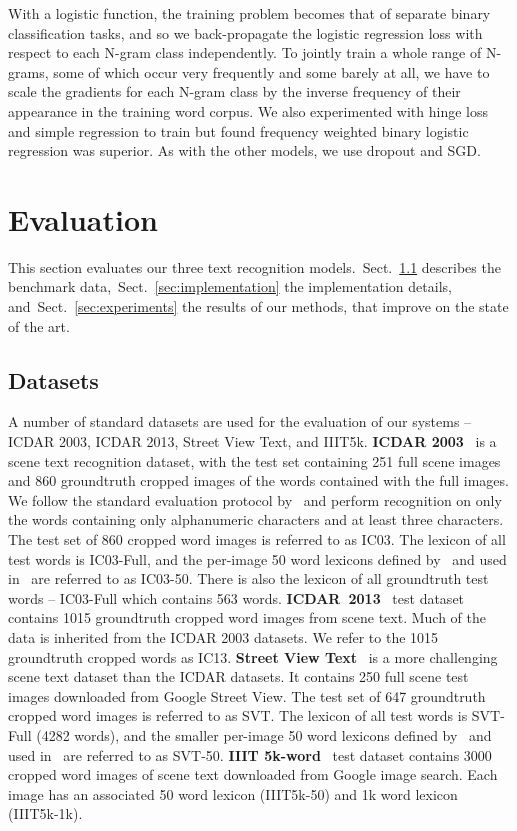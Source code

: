 \documentclass{article} \usepackage{nips14submit_e,times}
\newcommand{\sref}[1]{Sect.~\ref{#1}}
\renewcommand{\paragraph}[1]{\par\noindent{\bf #1}}
\begin{document}
\paragraph{Training.}
With a logistic function, the training problem becomes that of  separate binary classification tasks, and so we back-propagate the logistic regression loss with respect to each N-gram class independently. To jointly train a whole range of N-grams, some of which occur very frequently and some barely at all, we have to scale the gradients for each N-gram class by the inverse frequency of their appearance in the training word corpus. We also experimented with hinge loss and simple regression to train but found frequency weighted binary logistic regression was superior. As with the other models, we use dropout and SGD.


\section{Evaluation}\label{sec:eval}
This section evaluates our three text recognition models.~\sref{sec:data} describes the benchmark data,~\sref{sec:implementation} the implementation details, and~\sref{sec:experiments} the results of our methods, that improve on the state of the art.


\subsection{Datasets}\label{sec:data}
A number of standard datasets are used for the evaluation of our systems -- ICDAR 2003, ICDAR 2013, Street View Text, and IIIT5k. {\bf ICDAR 2003}~\cite{ICDAR03} is a scene text recognition dataset, with the test set containing 251 full scene images and 860 groundtruth cropped images of the words contained with the full images. We follow the standard evaluation protocol by~\cite{Wang11,Wang12,Alsharif13} and perform recognition on only the words containing only alphanumeric characters and at least three characters. The test set of 860 cropped word images is referred to as IC03. The lexicon of all test words is IC03-Full, and the per-image 50 word lexicons defined by~\cite{Wang11} and used in~\cite{Wang11,Wang12,Alsharif13} are referred to as IC03-50. There is also the lexicon of all groundtruth test words -- IC03-Full which contains 563 words. {\bf ICDAR~2013}~\cite{ICDAR2013} test dataset contains 1015 groundtruth cropped word images from scene text. Much of the data is inherited from the ICDAR 2003 datasets. We refer to the 1015 groundtruth cropped words as IC13. {\bf Street View Text}~\cite{Wang11} is a more challenging scene text dataset than the ICDAR datasets. It contains 250 full scene test images downloaded from Google Street View. The test set of 647 groundtruth cropped word images is referred to as SVT. The lexicon of all test words is SVT-Full (4282 words), and the smaller per-image 50 word lexicons defined by~\cite{Wang11} and used in~\cite{Wang11,Wang12,Alsharif13,Bissacco13} are referred to as SVT-50. {\bf IIIT 5k-word}~\cite{Mishra12} test dataset contains 3000 cropped word images of scene text downloaded from Google image search. Each image has an associated 50 word lexicon (IIIT5k-50) and 1k word lexicon (IIIT5k-1k).
\end{document}
